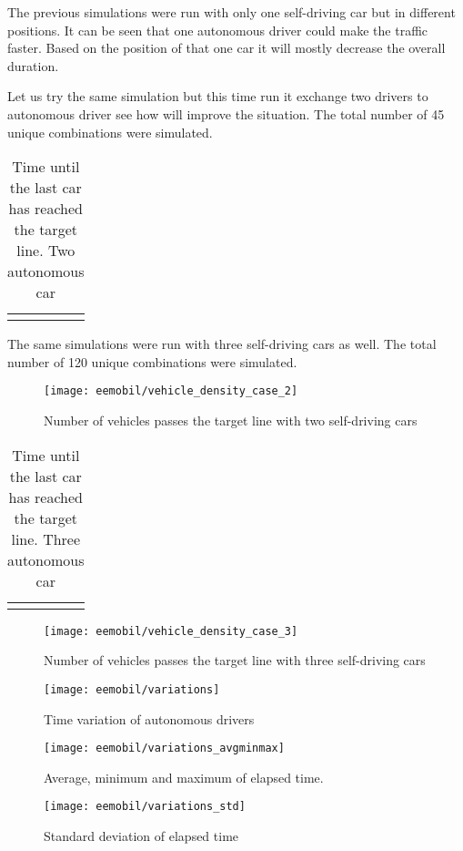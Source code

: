 		The previous simulations were run with only one self-driving car but in different positions. It can be seen that one autonomous driver could make the traffic faster. Based on the position of that one car it will mostly decrease the overall duration. 
		
		Let us try the same simulation but this time run it exchange two drivers to autonomous driver see how will improve the situation. The total number of 45 unique combinations were simulated.
		\begin{table}[ht]
			\begin{center}
				\begin{tabular}{ |c|c|c|c|}
					\hline
					\vehicledensitytable{2}
					\hline
				\end{tabular}
			\end{center}
			\caption{Time until the last car has reached the target line. Two autonomous car}
			\label{tab:vehicle_density_minmaxavg_case2}
		\end{table}
		
		The same simulations were run with three self-driving cars as well. The total number of 120 unique combinations were simulated.
		\begin{figure}[ht]
			\centering
			\texttt{[image: eemobil/vehicle\_density\_case\_2]}
			\caption{Number of vehicles passes the target line with two self-driving cars}
			\label{fig:vehicle_density_case_2}
		\end{figure}
		\begin{table}[ht]
			\begin{center}
				\begin{tabular}{ |c|c|c|c|}
					\hline
					\vehicledensitytable{3}
					\hline
				\end{tabular}
			\end{center}
			\caption{Time until the last car has reached the target line. Three autonomous car}
			\label{tab:vehicle_density_minmaxavg_case3}
		\end{table}
		\begin{figure}[ht]
			\centering
			\texttt{[image: eemobil/vehicle\_density\_case\_3]}
			\caption{Number of vehicles passes the target line with three self-driving cars}
			\label{fig:vehicle_density_case_3}
		\end{figure}
		
		\begin{figure}
			\centering
			\texttt{[image: eemobil/variations]}
			\caption{Time variation of autonomous drivers}
			\label{fig:self_variations}
		\end{figure}
		\begin{figure}
			\centering
			\texttt{[image: eemobil/variations\_avgminmax]}
			\caption{Average, minimum and maximum of elapsed time.}
			\label{fig:self_variations_avgminmax}
		\end{figure}
		\begin{figure}
			\centering
			\texttt{[image: eemobil/variations\_std]}
			\caption{Standard deviation of elapsed time}
			\label{fig:self_variations_std}
		\end{figure}
